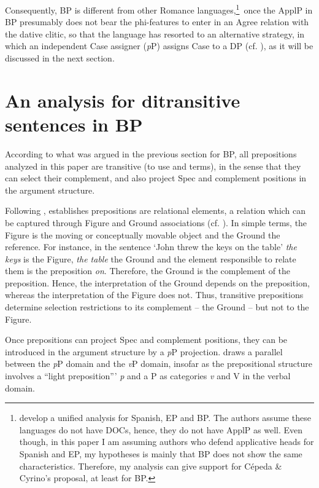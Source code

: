 \documentclass[output=paper,colorlinks,citecolor=brown,modfonts,nonflat]{langsci/langscibook}
\begin{document}
Consequently, BP is different from other Romance languages,\footnote{ develop a unified analysis for Spanish, EP and BP. The authors assume these languages do not have DOCs, hence, they do not have ApplP as well. Even though, in this paper I am assuming authors who defend applicative heads for Spanish and EP, my hypotheses is mainly that BP does not show the same characteristics. Therefore, my analysis can give support for Cépeda \& Cyrino’s proposal, at least for BP.}~once the ApplP in BP presumably does not bear the phi-features to enter in an Agree relation with the dative clitic, so that the language has resorted to an alternative strategy, in which an independent Case assigner (\textit{p}P) assigns Case to a DP (cf. \citealt{Calindro2015,Calindro2016}), as it will be discussed in the next section.

\section{An analysis for ditransitive sentences in BP}\label{sec:calindro:3}

According to what was argued in the previous section for BP, all prepositions analyzed in this paper are transitive (to use \citealt{Svenonius2004Arguments} and \citealt{Cuervo2010Probus} terms), in the sense that they can select their complement, and also project Spec and complement positions in the argument structure.

Following \citet{HaleKeyser2002}, \citet{Svenonius2004Arguments} establishes prepositions are relational elements, a relation which can be captured through Figure and Ground associations (cf. \citealt{Talmy1978}). In simple terms, the Figure is the moving or conceptually movable object and the Ground the reference. For instance, in the sentence ‘John threw the keys on the table’ \textit{the keys} is the Figure, \textit{the table} the Ground and the element responsible to relate them is the preposition \textit{on}. Therefore, the Ground is the complement of the preposition. Hence, the interpretation of the Ground depends on the preposition, whereas the interpretation of the Figure does not. Thus, transitive prepositions determine selection restrictions to its complement – the Ground – but not to the Figure.

Once prepositions can project Spec and complement positions, they can be introduced in the argument structure by a \textit{p}P projection. \citet[180]{Wood2012} draws a parallel between the \textit{p}P domain and the \textit{v}P domain, insofar as the prepositional structure involves a  ``light preposition''’ \textit{p} and a P as categories \textit{v} and V in the verbal domain.
\end{document}
